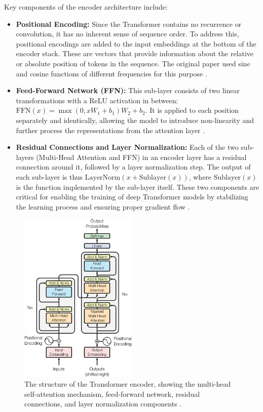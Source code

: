 Key components of the encoder architecture include:
\begin{itemize}
    \item \textbf{Positional Encoding:} Since the Transformer contains no recurrence or convolution, it has no inherent sense of sequence order. To address this, positional encodings are added to the input embeddings at the bottom of the encoder stack. These are vectors that provide information about the relative or absolute position of tokens in the sequence. The original paper used sine and cosine functions of different frequencies for this purpose \citep{vaswani2017attention}.
    \item \textbf{Feed-Forward Network (FFN):} This sub-layer consists of two linear transformations with a ReLU activation in between: \(\text{FFN}(x) = \max(0, xW_1 + b_1)W_2 + b_2\). It is applied to each position separately and identically, allowing the model to introduce non-linearity and further process the representations from the attention layer \citep{vaswani2017attention}.
    \item \textbf{Residual Connections and Layer Normalization:} Each of the two sub-layers (Multi-Head Attention and FFN) in an encoder layer has a residual connection around it, followed by a layer normalization step. The output of each sub-layer is thus \(\text{LayerNorm}(x + \text{Sublayer}(x))\), where \(\text{Sublayer}(x)\) is the function implemented by the sub-layer itself. These two components are critical for enabling the training of deep Transformer models by stabilizing the learning process and ensuring proper gradient flow \citep{ba2016layer}.
\end{itemize}

\begin{figure}[tb]
\centering
\includegraphics[width=0.5\textwidth]{logos/transformer.png}
\caption[Transformer encoder architecture]{The structure of the Transformer encoder, showing the multi-head self-attention mechanism, feed-forward network, residual connections, and layer normalization components \cite{vaswani2017attention}.}
\label{fig:transformer_encoder}
\end{figure}

